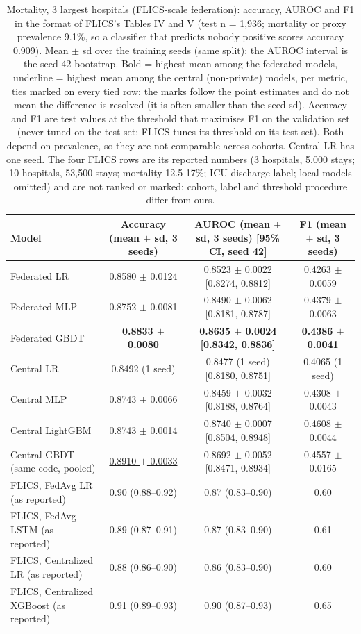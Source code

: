\begin{table}[t]
\centering\small
\caption{Mortality, 3 largest hospitals (FLICS-scale federation): accuracy, AUROC and F1 in the format of FLICS's Tables IV and V (test n = 1,936; mortality or proxy prevalence 9.1\%, so a classifier that predicts nobody positive scores accuracy 0.909). Mean $\pm$ sd over the training seeds (same split); the AUROC interval is the seed-42 bootstrap. Bold = highest mean among the federated models, underline = highest mean among the central (non-private) models, per metric, ties marked on every tied row; the marks follow the point estimates and do not mean the difference is resolved (it is often smaller than the seed sd). Accuracy and F1 are test values at the threshold that maximises F1 on the validation set (never tuned on the test set; FLICS tunes its threshold on its test set). Both depend on prevalence, so they are not comparable across cohorts. Central LR has one seed. The four FLICS rows are its reported numbers (3 hospitals, 5,000 stays; 10 hospitals, 53,500 stays; mortality 12.5-17\%; ICU-discharge label; local models omitted) and are not ranked or marked: cohort, label and threshold procedure differ from ours.}\label{tab:final_top3}
\begin{tabular}{lccc}
\toprule
Model & Accuracy (mean $\pm$ sd, 3 seeds) & AUROC (mean $\pm$ sd, 3 seeds) [95\% CI, seed 42] & F1 (mean $\pm$ sd, 3 seeds) \\
\midrule
Federated LR & 0.8580 $\pm$ 0.0124 & 0.8523 $\pm$ 0.0022 [0.8274, 0.8812] & 0.4263 $\pm$ 0.0059 \\
Federated MLP & 0.8752 $\pm$ 0.0081 & 0.8490 $\pm$ 0.0062 [0.8181, 0.8787] & 0.4379 $\pm$ 0.0063 \\
Federated GBDT & \textbf{0.8833 $\pm$ 0.0080} & \textbf{0.8635 $\pm$ 0.0024 [0.8342, 0.8836]} & \textbf{0.4386 $\pm$ 0.0041} \\
Central LR & 0.8492 (1 seed) & 0.8477 (1 seed) [0.8180, 0.8751] & 0.4065 (1 seed) \\
Central MLP & 0.8743 $\pm$ 0.0066 & 0.8459 $\pm$ 0.0032 [0.8188, 0.8764] & 0.4308 $\pm$ 0.0043 \\
Central LightGBM & 0.8743 $\pm$ 0.0014 & \underline{0.8740 $\pm$ 0.0007 [0.8504, 0.8948]} & \underline{0.4608 $\pm$ 0.0044} \\
Central GBDT (same code, pooled) & \underline{0.8910 $\pm$ 0.0033} & 0.8692 $\pm$ 0.0052 [0.8471, 0.8934] & 0.4557 $\pm$ 0.0165 \\
FLICS, FedAvg LR (as reported) & 0.90 (0.88–0.92) & 0.87 (0.83–0.90) & 0.60 \\
FLICS, FedAvg LSTM (as reported) & 0.89 (0.87–0.91) & 0.87 (0.83–0.90) & 0.61 \\
FLICS, Centralized LR (as reported) & 0.88 (0.86–0.90) & 0.86 (0.83–0.90) & 0.60 \\
FLICS, Centralized XGBoost (as reported) & 0.91 (0.89–0.93) & 0.90 (0.87–0.93) & 0.65 \\
\bottomrule
\end{tabular}
\end{table}

